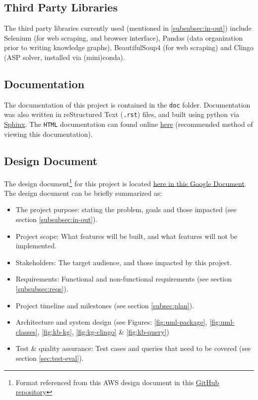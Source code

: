 \documentclass[12pt]{article}
\def \docLink{https://cse505.readthedocs.io/en/latest/?badge=latest}
\def \desDocLink{https://docs.google.com/document/d/1t48in8rdzC_VOijfAOP23C_YgAQxkow5eaE7AXEVUYM/edit?usp=sharing}
\begin{document}
    \subsection{Third Party Libraries}
    \label{subsec:thirdparty}

    The third party libraries currently used (mentioned in \ref{subsubsec:in-out}) include Selenium (for web scraping, and browser interface), Pandas (data organization prior to writing knowledge graphs), BeautifulSoup4 (for web scraping) and Clingo (ASP solver, installed via (mini)conda).

    \subsection{Documentation}
    \label{subsec:docs}

    The documentation of this project is contained in the {\tt{doc}} folder. Documentation was also written in reStructured Text ({\tt{.rst}}) files, and built using python via \href{https://www.sphinx-doc.org/en/master/}{Sphinx}. The {\tt{HTML}} documentation can found online \href{\docLink}{here} (recommended method of viewing this documentation).

    \subsection{Design Document}
    \label{subsec:design-docs}

    The design document\footnote{Format referenced from this AWS design document in this \href{https://github.com/aws/aws-sam-cli/blob/develop/designs/intrinsics_design.md}{GitHub repository}} for this project is located \href{\desDocLink}{here in this Google Document}. The design document can be briefly summarized as:

    \begin{itemize}
        \item The project purpose: stating the problem, goals and those impacted (see section \ref{subsubsec:in-out}).
        \item Project scope: What features will be built, and what features will not be implemented.
        \item Stakeholders: The target audience, and those impacted by this project.
        \item Requirements: Functional and non-functional requirements (see section \ref{subsubsec:reqs}).
        \item Project timeline and milestones (see section \ref{subsec:plan}).
        \item Architecture and system design (see Figures: \ref{fig:uml-package}, \ref{fig:uml-classes}, \ref{fig:kb-kg}, \ref{fig:kg-clingo} \& \ref{fig:kb-query})
        \item Test \& quality assurance: Test cases and queries that need to be covered (see section \ref{sec:test-eval}).
    \end{itemize}
    
\end{document}

